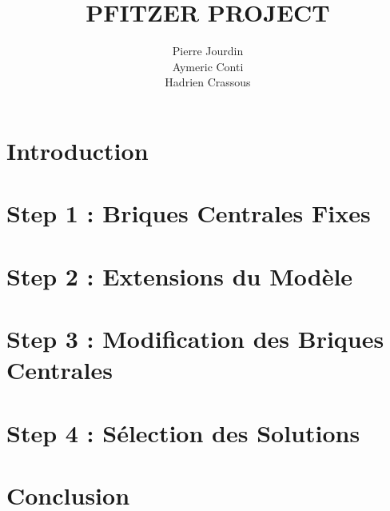 \documentclass[12pt,a4paper]{article}
\title{PFITZER PROJECT}
\author{Pierre Jourdin \\ Aymeric Conti \\ Hadrien Crassous}
\begin{document}
\maketitle
\tableofcontents
\newpage

\section*{Introduction}

\section*{Step 1 : Briques Centrales Fixes}


\section*{Step 2 : Extensions du Modèle}


\section*{Step 3 : Modification des Briques Centrales}


\section*{Step 4 : Sélection des Solutions}


\section*{Conclusion}
\end{document}
